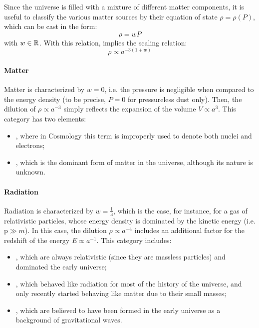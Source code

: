 Since the universe is filled with a mixture of different matter components, it is useful to classify the various matter sources by their equation of state $ \rho = \rho(P) $, which can be cast in the form:
\begin{equation}
  \rho = w P
\end{equation}
with $ w \in \mathbb{R} $. With this relation,  implies the scaling relation:
\begin{equation}
  \rho \propto a^{-3 (1 + w)}
\end{equation}

\paragraph{Matter}

Matter is characterized by $ w = 0 $, i.e. the pressure is negligible when compared to the energy density (to be precise, $ P = 0 $ for pressureless dust only). Then, the dilution of $ \rho \propto a^{-3} $ simply reflects the expansion of the volume $ V \propto a^3 $. This category has two elements:
\begin{itemize}
  \item {}, where in Cosmology this term is improperly used to denote both nuclei and electrons\footnotemark;
  \item {}, which is the dominant form of matter in the universe, although its nature is unknown.
\end{itemize}


\paragraph{Radiation}

Radiation is characterized by $ w = \frac{1}{3} $, which is the case, for instance, for a gas of relativistic particles, whose energy density is dominated by the kinetic energy (i.e. $ \text{p} \gg m $). In this case, the dilution $ \rho \propto a^{-4} $ includes an additional factor for the redshift of the energy $ E \propto a^{-1} $. This category includes:
\begin{itemize}
  \item {}, which are always relativistic (since they are massless particles) and dominated the early universe;
  \item {}, which behaved like radiation for most of the history of the universe, and only recently started behaving like matter due to their small masses;
  \item {}, which are believed to have been formed in the early universe as a background of gravitational waves.
\end{itemize}

